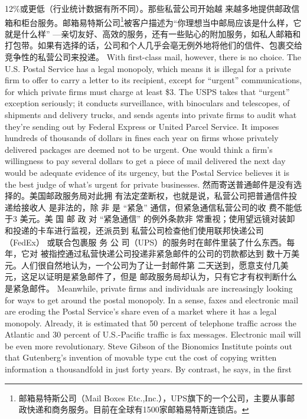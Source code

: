 \begin{paracol}{2}
12\%或更低（行业统计数据有所不同）。那些私营公司开始越
来越多地提供邮政信箱和柜台服务。邮箱易特斯公司\footnote{邮箱易特斯公司（Mail  Boxes Etc.,Inc.），UPS旗下的一个公司，主要从事邮政快递和商务服务。目前在全球有1500家邮箱易特斯连锁店。}被客户描述为“你理想当中邮局应该是什么样，它 就是什么样” ---亲切友好、高效的服务，还有一些贴心的附加服务，如私人邮箱和打包带。如果有选择的话，公司和个人几乎会亳无例外地将他们的信件、包裹交给竞争性的私营公司来投递。
\switchcolumn*
With first-class mail, however, there is no choice. The U.S.
Postal Service has a legal monopoly, which means it is illegal for
a private firm to offer to carry a letter to its recipient, except for
``urgent'' communications, for which private firms must charge
at least \$3. The USPS takes that ``urgent'' exception seriously;
it conducts surveillance, with binoculars and telescopes, of shipments and delivery trucks, and sends agents into private firms
to audit what they're sending out by Federal Express or United
Parcel Service. It imposes hundreds of thousands of dollars in
fines each year on firms whose privately delivered packages are
deemed not to be urgent. One would think a firm's willingness
to pay several dollars to get a piece of mail delivered the next
day would be adequate evidence of its urgency, but the Postal
Service believes it is the best judge of what's urgent for private
businesses.
\switchcolumn
然而寄送普通邮件是没有选择的。美国邮政服务局对此拥
有法定垄断权，也就是说，私营公司把普通信件投递给接收人
是非法的，除 非 是 “紧急” 通信，但紧急通信私营公司的收
费不能低于3 美元。美 国 邮 政 对 “紧急通信” 的例外条款非
常重视；使用望远镜对装卸和投递的卡车进行监视，还派员到
私营公司检查他们使用联邦快递公司（FedEx） 或联合包裹服
务 公 司（UPS）的服务时在邮件里装了什么东西。每年，它对
被指控通过私营快递公司投递非紧急邮件的公司的罚款都达到
数十万美元。人们很自然地认为，一个公司为了让一封邮件第
二天送到，愿意支付几美元，这足以证明是紧急邮件了，但是
邮政服务局却认为，只有它才有权判断什么是紧急邮件。
\switchcolumn*
Meanwhile, private firms and individuals are increasingly
looking for ways to get around the postal monopoly. In a sense,
faxes and electronic mail are eroding the Postal Service's share
even of a market where it has a legal monopoly. Already, it is estimated that 50 percent of telephone traffic across the Atlantic
and 30 percent of U.S.-Pacific traffic is fax messages. Electronic
mail will be even more revolutionary. Steve Gibson of the Bionomics Institute points out that Gutenberg's invention of movable type cut the cost of copying written information a
thousandfold in just forty years. By contrast, he says, in the first

\end{paracol}
